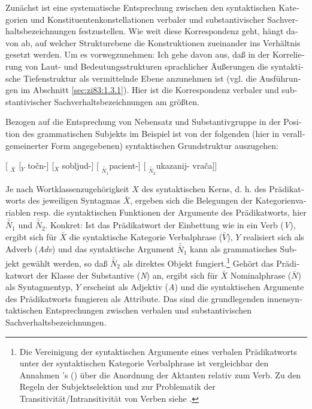 \documentclass[output=paper]{langscibook}
\begin{document}
\begin{otherlanguage}{german}
Zunächst ist eine systematische Entsprechung zwischen den syntaktischen Kategorien und Konstituentenkonstellationen verbaler und substantivischer Sachverhaltsbezeichnungen festzustellen. Wie weit diese Korrespondenz geht, hängt davon ab, auf welcher Strukturebene die Konstruktionen zueinander ins Verhältnis gesetzt werden. Um es vorwegzunehmen: Ich gehe davon aus, daß in der Korrelierung von Laut- und Bedeutungsstrukturen sprachlicher Äußerungen die syntaktische Tiefenstruktur als vermittelnde Ebene anzunehmen ist (vgl. die Ausführungen im Abschnitt \ref{sec:zi83:1.3.1}). Hier ist die Korrespondenz verbaler und substantivischer Sachverhaltsbezeichnungen am größten.

Bezogen auf die Entsprechung von Nebensatz und Substantivgruppe in der Position des grammatischen Subjekts im Beispiel  ist von der folgenden (hier in verallgemeinerter Form angegebenen) syntaktischen Grundstruktur auszugehen:

\ea \label{ex:zi83:4} [ $_{\bar{X}}$ [$_{Y}$ točn-] [$_{X}$ sobljud-] [ $_{\bar{\bar{N}}_{1}}$pacient-] [ $_{\bar{\bar{N}}_{2}}$ukazanij- vrača]]
\z

\noindent Je nach Wortklassenzugehörigkeit $X$ des syntaktischen Kerns, d. h. des Prädikatworts des jeweiligen Syntagmas $\bar{X}$, ergeben sich die Belegungen der Kategorienvariablen resp. die syntaktischen Funktionen der Argumente des Prädikatworts, hier ${\bar{\bar{N}}_{1}}$ und ${\bar{\bar{N}}_{2}}$. Konkret: Ist das Prädikatwort der Einbettung wie in  ein Verb (\textit{V}), ergibt sich für $\bar{X}$ die syntaktische Kategorie Verbalphrase ($\bar{V}$), $Y$ realisiert sich als Adverb (\textit{Adv}) und das syntaktische Argument ${\bar{\bar{N}}_{1}}$ kann als gram\-mati\-sches Subjekt gewählt werden, so daß ${\bar{\bar{N}}_{2}}$ als direktes Objekt fungiert.\footnote{Die Vereinigung der syntaktischen Argumente eines verbalen Prädikatworts unter der syntaktischen Kategorie Verbalphrase ist vergleichbar den Annahmen  \citeauthor{fillmore1968the-case-for-case}'s (\citeyear{fillmore1968the-case-for-case}) über die Anordnung der Aktanten relativ zum Verb. Zu den Regeln der Subjektselektion und zur Problematik der Transitivität/Intransitivität von Verben siehe \citet{zimmermann1978sintaksiceskie-funkcii-aktantov-zalog-i-perechodnost}.} Gehört das Prädikatwort der Klasse der Substantive (\textit{N}) an, ergibt sich für $\bar{X}$ Nominalphrase ($\bar{N}$) als Syntagmentyp, $Y$ erscheint als Adjektiv (\textit{A}) und die syntaktischen Argumente des Prädikatworts fungieren als Attribute. Das sind die grundlegenden innensyntaktischen Entsprechungen zwischen verbalen und sub\-stan\-ti\-vi\-schen Sachverhaltsbezeichnungen.


\end{otherlanguage}
\end{document}
